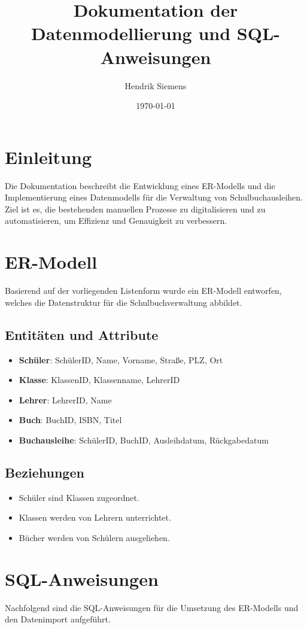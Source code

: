 \documentclass[12pt,a4paper]{article}
\title{Dokumentation der Datenmodellierung und SQL-Anweisungen}
\author{Hendrik Siemens}
\date{\today}
\begin{document}
\maketitle

\tableofcontents
\newpage

\section{Einleitung}
Die Dokumentation beschreibt die Entwicklung eines ER-Modells und die Implementierung eines Datenmodells für die Verwaltung von Schulbuchausleihen. Ziel ist es, die bestehenden manuellen Prozesse zu digitalisieren und zu automatisieren, um Effizienz und Genauigkeit zu verbessern.

\section{ER-Modell}
Basierend auf der vorliegenden Listenform wurde ein ER-Modell entworfen, welches die Datenstruktur für die Schulbuchverwaltung abbildet.

\subsection{Entitäten und Attribute}
\begin{itemize}
  \item \textbf{Schüler}: SchülerID, Name, Vorname, Straße, PLZ, Ort
  \item \textbf{Klasse}: KlassenID, Klassenname, LehrerID
  \item \textbf{Lehrer}: LehrerID, Name
  \item \textbf{Buch}: BuchID, ISBN, Titel
  \item \textbf{Buchausleihe}: SchülerID, BuchID, Ausleihdatum, Rückgabedatum
\end{itemize}

\subsection{Beziehungen}
\begin{itemize}
  \item Schüler sind Klassen zugeordnet.
  \item Klassen werden von Lehrern unterrichtet.
  \item Bücher werden von Schülern ausgeliehen.
\end{itemize}

\newpage
\section{SQL-Anweisungen}
Nachfolgend sind die SQL-Anweisungen für die Umsetzung des ER-Modells und den Datenimport aufgeführt.
\end{document}
